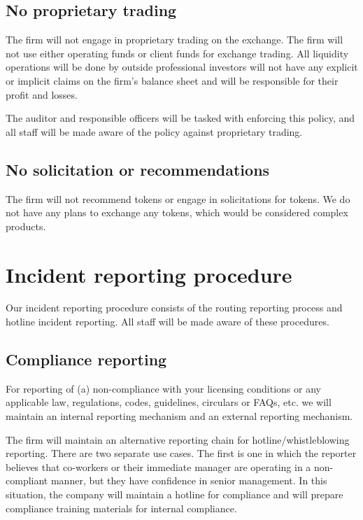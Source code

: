 \subsection{No proprietary trading}

The firm will not engage in proprietary trading on the exchange.  The firm will not use either operating funds or client funds for exchange
trading.  All liquidity operations will be done by outside
professional investors will not have any explicit or implicit claims
on the firm's balance sheet and will be responsible for their
profit and losses.

The auditor and responsible officers will be tasked with enforcing
this policy, and all staff will be made aware of the policy against
proprietary trading.

\subsection{No solicitation or recommendations}
The firm will not recommend tokens or engage in solicitations for
tokens.  We do not have any plans to exchange any tokens, which would
be considered complex products.

\section{Incident reporting procedure}

Our incident reporting procedure consists of the routing reporting
process and hotline incident reporting.  All staff will be
made aware of these procedures.

\subsection{Compliance reporting}

For reporting of (a) non-compliance with your licensing conditions or
any applicable law, regulations, codes, guidelines, circulars or
FAQs, etc. we will maintain an internal reporting mechanism and an
external reporting mechanism.

The firm will maintain an alternative reporting chain for
hotline/whistleblowing reporting.  There are two separate use cases.
The first is one in which the reporter believes that co-workers or
their immediate manager are operating in a non-compliant manner, but
they have confidence in senior management.  In this situation, the
company will maintain a hotline for compliance and will prepare
compliance training materials for internal compliance.


